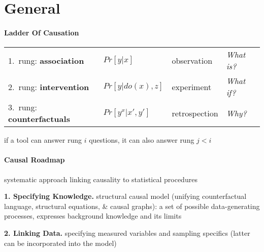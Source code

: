 \documentclass[8pt,twoside]{extarticle}
\begin{document}











\section{General}

\begin{multicols}{2}

\paragraph{Ladder Of Causation} \citep{pearl2019seven}


\begin{minipage}{\textwidth}
\hspace{-0.9em}
\begin{tabular}{l@{\hskip 5pt} l@{\hskip 5pt}l@{\hskip 5pt}l@{\hskip 5pt}}
1.\ rung: \textbf{association} & $Pr\left[y|x\right]$ & observation & \textit{What is?} \\
2.\ rung: \textbf{intervention} & $Pr\left[y|do(x),z\right]$ & experiment & \textit{What if?} \\
3.\ rung: \textbf{counterfactuals} & $Pr\left[y^x|x',y'\right]$ & retrospection & \textit{Why?}
\end{tabular}
\end{minipage}
if a tool can answer rung $i$ questions, it can also answer rung $j<i$


\paragraph{Causal Roadmap} \citep{petersen2014causal} 
systematic approach linking causality to statistical procedures

 \textbf{1. Specifying Knowledge.} structural causal model (unifying counterfactual language, structural equations, \& causal graphs): a set of possible data-generating processes, expresses background knowledge and its limits

 \textbf{2. Linking Data.} specifying measured variables and sampling specifics (latter can be incorporated into the model)


\end{multicols}
\end{document}
